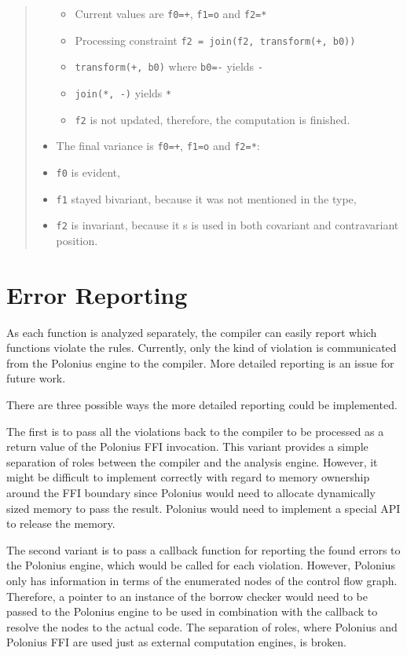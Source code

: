 \documentclass[
  11pt,
  twoside,symmetric]{report}
\providecommand{\tightlist}{%
  \setlength{\itemsep}{0pt}\setlength{\parskip}{0pt}}
\begin{document}
\begin{quote}
\begin{itemize}
  \begin{itemize}
  \tightlist
  \item
    Current values are \texttt{f0=+}, \texttt{f1=o} and \texttt{f2=*}
  \item
    Processing constraint \texttt{f2\ =\ join(f2,\ transform(+,\ b0))}
  \item
    \texttt{transform(+,\ b0)} where \texttt{b0=-} yields \texttt{-}
  \item
    \texttt{join(*,\ -)} yields \texttt{*}
  \item
    \texttt{f2} is not updated, therefore, the computation is finished.
  \end{itemize}
\item
  The final variance is \texttt{f0=+}, \texttt{f1=o} and \texttt{f2=*}:
\item
  \texttt{f0} is evident,
\item
  \texttt{f1} stayed bivariant, because it was not mentioned in the
  type,
\item
  \texttt{f2} is invariant, because it s is used in both covariant and
  contravariant position.
\end{itemize}
\end{quote}

\hypertarget{error-reporting}{%
\section{Error Reporting}\label{error-reporting}}

As each function is analyzed separately, the compiler can easily report
which functions violate the rules. Currently, only the kind of violation
is communicated from the Polonius engine to the compiler. More detailed
reporting is an issue for future work.

There are three possible ways the more detailed reporting could be
implemented.

The first is to pass all the violations back to the compiler to be
processed as a return value of the Polonius FFI invocation. This variant
provides a simple separation of roles between the compiler and the
analysis engine. However, it might be difficult to implement correctly
with regard to memory ownership around the FFI boundary since Polonius
would need to allocate dynamically sized memory to pass the result.
Polonius would need to implement a special API to release the memory.

The second variant is to pass a callback function for reporting the
found errors to the Polonius engine, which would be called for each
violation. However, Polonius only has information in terms of the
enumerated nodes of the control flow graph. Therefore, a pointer to an
instance of the borrow checker would need to be passed to the Polonius
engine to be used in combination with the callback to resolve the nodes
to the actual code. The separation of roles, where Polonius and Polonius
FFI are used just as external computation engines, is broken.
\end{document}

